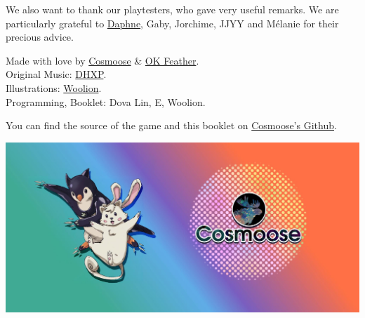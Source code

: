 \documentclass{article}
\begin{document}
We also want to thank our playtesters, who gave very useful remarks.
We are particularly grateful to \href{https://daphnecerez.carrd.co/}{Daphne},
Gaby, Jorchime, JJYY and Mélanie for their precious advice.

Made with love by \href{https://cosmoose.org/}{Cosmoose} \& \href{https://okfeather.com/}{OK Feather}.\\
Original Music: \href{https://linktr.ee/dhxp}{DHXP}.\\
Illustrations: \href{https://twitter.com/wooliondraws}{Woolion}.\\
Programming, Booklet: Dova Lin, E, Woolion.

You can find the source of the game and this booklet on
\href{https://github.com/cosmoosic/cc-star}{Cosmoose's Github}.

\vspace*{\fill}

\begin{center}
    \includegraphics[height=.35\paperheight]{img/ccend}
\end{center}


\clearpage
\end{document}
